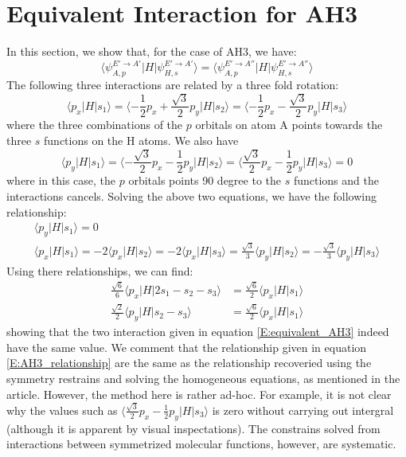 \documentclass{article}
\begin{document}
\section{Equivalent Interaction for AH3}
In this section, we show that, for the case of AH3, we have:
\begin{equation}
    \label{E:equivalent_AH3}
    \langle \psi^{E'\to A'}_{A,p} | H | \psi^{E'\to A'}_{H,s} \rangle = \langle \psi^{E'\to A''}_{A,p} | H | \psi^{E'\to A''}_{H,s} \rangle
\end{equation}
The following three interactions are related by a three fold rotation:
\begin{equation}
    \langle p_x | H | s_1 \rangle = \langle -\frac{1}{2}p_x + \frac{\sqrt{3}}{2}p_y | H | s_2 \rangle 
    = \langle -\frac{1}{2}p_x - \frac{\sqrt{3}}{2}p_y | H | s_3 \rangle
\end{equation}
where the three combinations of the $p$ orbitals on atom A points towards the three $s$ functions on the H atoms. We also have 
\begin{equation}
    \langle p_y | H | s_1 \rangle = \langle -\frac{\sqrt{3}}{2}p_x - \frac{1}{2}p_y | H | s_2 \rangle 
    = \langle \frac{\sqrt{3}}{2}p_x - \frac{1}{2}p_y | H | s_3 \rangle = 0
\end{equation}
where in this case, the $p$ orbitals points 90 degree to the $s$ functions and the interactions cancels.
Solving the above two equations, we have the following relationship:
\begin{gather}
    \label{E:AH3_relationship}
    \langle p_y | H | s_1 \rangle = 0 \\
    \langle p_x | H | s_1 \rangle = -2 \langle p_x | H | s_2 \rangle = -2 \langle p_x | H | s_3 \rangle = 
    \frac{\sqrt{3}}{3} \langle p_y | H | s_2 \rangle = - \frac{\sqrt{3}}{3} \langle p_y | H | s_3 \rangle
\end{gather}
Using there relationships, we can find:
\begin{align}
   \frac{\sqrt{6}}{6} \langle p_x | H | 2 s_1 -  s_2 -  s_3 \rangle &= \frac{\sqrt{6}}{2} \langle p_x | H | s_1 \rangle \\
   \frac{\sqrt{2}}{2} \langle p_y | H | s_2 -  s_3 \rangle &= \frac{\sqrt{6}}{2} \langle p_x | H | s_1 \rangle 
\end{align}
showing that the two interaction given in equation \eqref{E:equivalent_AH3} indeed have the same value. 
We comment that the relationship given in equation \eqref{E:AH3_relationship} are the same as the relationship 
recoveried using the symmetry restrains and solving the homogeneous equations, as mentioned in the 
article. However, the method here is rather ad-hoc. For example, it is not clear why the values such as 
$\langle \frac{\sqrt{3}}{2}p_x - \frac{1}{2}p_y | H | s_3 \rangle$ is zero without carrying out intergral (although 
it is apparent by visual inspectations). The constrains solved from interactions between symmetrized molecular 
functions, however, are systematic. 
\end{document}
